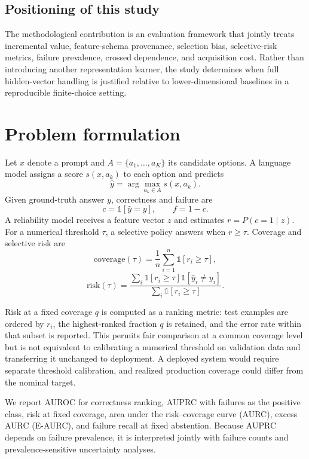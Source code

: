 \documentclass[preprint,12pt,authoryear]{elsarticle}
\begin{document}
\subsection{Positioning of this study}
The methodological contribution is an evaluation framework that jointly treats incremental value, feature-schema provenance, selection bias, selective-risk metrics, failure prevalence, crossed dependence, and acquisition cost. Rather than introducing another representation learner, the study determines when full hidden-vector handling is justified relative to lower-dimensional baselines in a reproducible finite-choice setting.

\section{Problem formulation}
Let $x$ denote a prompt and $A=\{a_1,\ldots,a_K\}$ its candidate options. A language model assigns a score $s(x,a_k)$ to each option and predicts
\begin{equation}
\hat{y}=\arg\max_{a_k\in A} s(x,a_k).
\end{equation}
Given ground-truth answer $y$, correctness and failure are
\begin{equation}
c=\mathbb{1}[\hat{y}=y], \qquad f=1-c.
\end{equation}
A reliability model receives a feature vector $z$ and estimates $r=P(c=1\mid z)$. For a numerical threshold $\tau$, a selective policy answers when $r\geq\tau$. Coverage and selective risk are
\begin{equation}
\mathrm{coverage}(\tau)=\frac{1}{n}\sum_{i=1}^{n}\mathbb{1}[r_i\geq\tau],
\end{equation}
\begin{equation}
\mathrm{risk}(\tau)=\frac{\sum_i \mathbb{1}[r_i\geq\tau]\mathbb{1}[\hat{y}_i\neq y_i]}{\sum_i \mathbb{1}[r_i\geq\tau]}.
\end{equation}

Risk at a fixed coverage $q$ is computed as a ranking metric: test examples are ordered by $r_i$, the highest-ranked fraction $q$ is retained, and the error rate within that subset is reported. This permits fair comparison at a common coverage level but is not equivalent to calibrating a numerical threshold on validation data and transferring it unchanged to deployment. A deployed system would require separate threshold calibration, and realized production coverage could differ from the nominal target.

We report AUROC for correctness ranking, AUPRC with failures as the positive class, risk at fixed coverage, area under the risk--coverage curve (AURC), excess AURC (E-AURC), and failure recall at fixed abstention. Because AUPRC depends on failure prevalence, it is interpreted jointly with failure counts and prevalence-sensitive uncertainty analyses.
\end{document}
